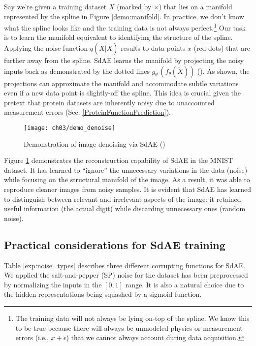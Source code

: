 \par Say we're given a training dataset $X$ (marked by $\times$) that lies on
a manifold represented by the spline in Figure \ref{demo:manifold}. In
practice, we don't know what the spline looks like and the training data is
not always perfect.\footnote{
  The training data will not always be lying on-top of the spline. We know
  this to be true because there will always be unmodeled physics or
  measurement errors (i.e., $x+\epsilon$) that we cannot always account
  during data acquisition.
} Our task is to learn the manifold equivalent to identifying the structure
of the spline. Applying the noise function $q(\widetilde{X}|X)$ results to
data points $\widetilde{x}$ (red dots) that are further away from the spline.
SdAE learns the manifold by projecting the noisy inputs back as demonstrated
by the dotted lines $g_{\theta^{\prime}}(f_{\theta}(\widetilde{X}))$
(\cite{vincent2008denoising}). As shown, the projections can approximate the
manifold and accommodate subtle variations even if a new data point is
slightly-off the spline. This idea is crucial given the pretext that protein
datasets are inherently noisy due to unaccounted measurement errors (Sec.
\ref{ProteinFunctionPrediction}).

\begin{figure}[h]
  \centering
  \texttt{[image: ch03/demo\_denoise]}
  \caption[Demonstration of image denoising via SdAE]{
    Demonstration of image denoising via SdAE (\cite{chollet2016autoencoders})}
  \label{demo:denoise}
\end{figure}

\par Figure \ref{demo:denoise} demonstrates the reconstruction capability of
SdAE in the MNIST dataset. It has learned to ``ignore'' the unnecessary
variations in the data (noise) while focusing on the structural manifold of
the image. As a result, it was able to reproduce cleaner images from noisy
samples. It is evident that SdAE has learned to distinguish between relevant
and irrelevant aspects of the image: it retained useful information (the
actual digit) while discarding unnecessary ones (random noise).

\subsection{Practical considerations for SdAE training}

\par Table \ref{exp:noise_types} describes three different corrupting functions
for SdAE. We applied the salt-and-pepper (SP) noise for the dataset has been
preprocessed by normalizing the inputs in the $\left[0,1\right]$ range. It is
also a natural choice due to the hidden representations being squashed by a
sigmoid function.


